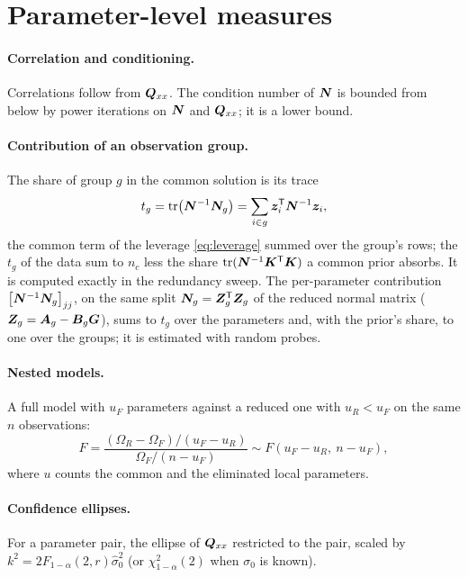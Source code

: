 \section{Parameter-level measures}

\paragraph{Correlation and conditioning.} Correlations follow from $\bm{Q}_{xx}$. The condition
number of $\bm{N}$ is bounded from below by power iterations on $\bm{N}$ and $\bm{Q}_{xx}$; it is a lower
bound.

\paragraph{Contribution of an observation group.} The share of group $g$ in the common solution is
its trace
\begin{equation}
t_g=\operatorname{tr}\bigl(\bm{N}^{-1}\bm{N}_g\bigr)=\sum_{i\in g}\bm{z}_i^{\mathsf T}\bm{N}^{-1}\bm{z}_i ,
\end{equation}
the common term of the leverage \eqref{eq:leverage} summed over the group's rows; the $t_g$ of the
data sum to $n_c$ less the share $\operatorname{tr}(\bm{N}^{-1}\bm{K}^{\mathsf T}\bm{K})$ a common prior absorbs. It is
computed exactly in the redundancy sweep. The per-parameter contribution
$\bigl[\bm{N}^{-1}\bm{N}_g\bigr]_{jj}$, on the same split $\bm{N}_g=\bm{Z}_g^{\mathsf T}\bm{Z}_g$ of the
reduced normal matrix ($\bm{Z}_g=\bm{A}_g-\bm{B}_g\bm{G}$), sums to $t_g$ over the parameters and,
with the prior's share, to one over the groups; it is estimated with random probes.

\paragraph{Nested models.} A full model with $u_F$ parameters against a reduced one with $u_R<u_F$ on
the same $n$ observations:
\begin{equation}
F=\frac{(\Omega_R-\Omega_F)/(u_F-u_R)}{\Omega_F/(n-u_F)}\sim F(u_F-u_R,\ n-u_F),
\end{equation}
where $u$ counts the common and the eliminated local parameters.

\paragraph{Confidence ellipses.} For a parameter pair, the ellipse of $\bm{Q}_{xx}$ restricted to the
pair, scaled by $k^2=2F_{1-\alpha}(2,r)\hat\sigma_0^2$ (or $\chi^2_{1-\alpha}(2)$ when $\sigma_0$ is known).
